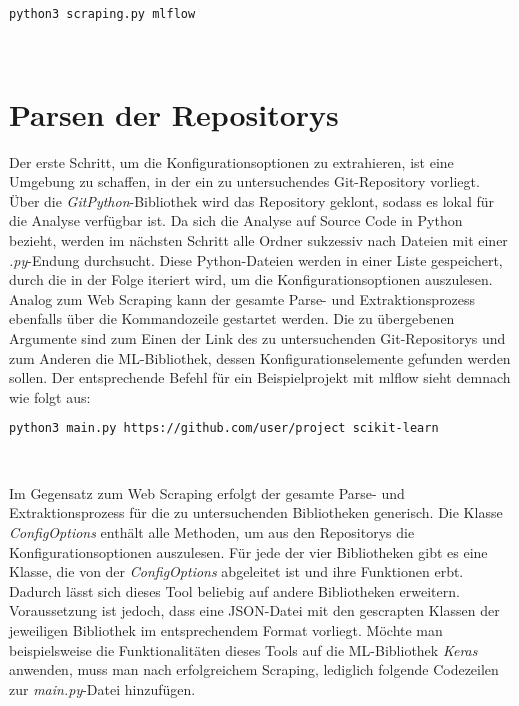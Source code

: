 \documentclass[german,bachelor]{swsLeipzig}
\begin{document}
\begin{lstlisting}[language=bash, frame=single, basicstyle=\small]
python3 scraping.py mlflow
\end{lstlisting}
\

\section{Parsen der Repositorys}
Der erste Schritt, um die Konfigurationsoptionen zu extrahieren, ist eine Umgebung zu schaffen, in der ein zu untersuchendes
Git-Repository vorliegt.
Über die \textit{GitPython}-Bibliothek wird das Repository geklont, sodass es lokal für die Analyse verfügbar ist.
Da sich die Analyse auf Source Code in Python bezieht, werden im nächsten Schritt alle Ordner sukzessiv nach Dateien mit
einer \textit{.py}-Endung durchsucht.
Diese Python-Dateien werden in einer Liste gespeichert, durch die in der Folge iteriert wird, um die Konfigurationsoptionen auszulesen. \\

Analog zum Web Scraping kann der gesamte Parse- und Extraktionsprozess ebenfalls über die Kommandozeile gestartet werden.
Die zu übergebenen Argumente sind zum Einen der Link des zu untersuchenden Git-Repositorys und zum Anderen die ML-Bibliothek, dessen
Konfigurationselemente gefunden werden sollen.
Der entsprechende Befehl für ein Beispielprojekt mit mlflow sieht demnach wie folgt aus: \\

\begin{lstlisting}[language=bash, frame=single, basicstyle=\small]
python3 main.py https://github.com/user/project scikit-learn
\end{lstlisting}
\

Im Gegensatz zum Web Scraping erfolgt der gesamte Parse- und Extraktionsprozess für die zu untersuchenden Bibliotheken generisch.
Die Klasse \textit{ConfigOptions} enthält alle Methoden, um aus den Repositorys die Konfigurationsoptionen auszulesen.
Für jede der vier Bibliotheken gibt es eine Klasse, die von der \textit{ConfigOptions} abgeleitet ist und ihre Funktionen erbt.
Dadurch lässt sich dieses Tool beliebig auf andere Bibliotheken erweitern.
Voraussetzung ist jedoch, dass eine JSON-Datei mit den gescrapten Klassen der jeweiligen Bibliothek im entsprechendem Format vorliegt.
Möchte man beispielsweise die Funktionalitäten dieses Tools auf die ML-Bibliothek \textit{Keras} anwenden, muss man nach erfolgreichem Scraping,
lediglich folgende Codezeilen zur \textit{main.py}-Datei hinzufügen.\\
\end{document}
